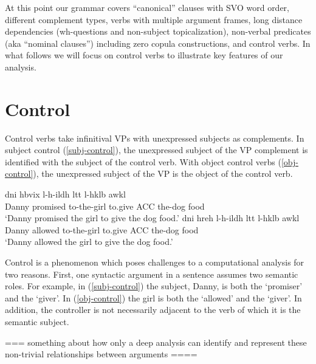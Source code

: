 \documentclass[a4paper]{article}
\begin{document}
At this point our grammar covers ``canonical'' clauses with SVO word order, different complement types, verbs with multiple argument frames, long distance dependencies (wh-questions and non-subject topicalization), non-verbal predicates (aka ``nominal clauses'') including zero copula constructions, and control verbs. In what follows we will focus on control verbs to illustrate key features of our analysis.

\section{Control}
Control verbs take infinitival VPs with unexpressed subjects as complements. In subject control (\ref{subj-control}), the unexpressed subject of the VP complement is identified with the subject of the control verb. With object control verbs (\ref{obj-control}), the unexpressed subject of the VP is the object of the control verb.

      \begin{exe}
         \ex \begin{xlist}

            \ex\label{subj-control}
                \gll dni hbvix l-h-ildh ltt l-hklb awkl\\
                     Danny promised to-the-girl to.give ACC the-dog food \\
                \trans `Danny promised the girl to give the dog food.'
            \ex\label{obj-control}
                \gll dni hreh l-h-ildh ltt l-hklb awkl\\
                     Danny allowed to-the-girl to.give ACC the-dog food \\
                \trans `Danny allowed the girl to give the dog food.'
         \end{xlist}
    \end{exe}

Control is a phenomenon which poses challenges to a computational analysis for two reasons. First, one syntactic argument in a sentence assumes two semantic roles. For example, in (\ref{subj-control}) the subject, Danny, is both the `promiser' and the `giver'. In (\ref{obj-control}) the girl is both the `allowed' and the `giver'. In addition, the controller is not necessarily adjacent to the verb of which it is the semantic subject.

 === something about how only a deep analysis can identify and represent these non-trivial relationships between arguments ====
\end{document}
